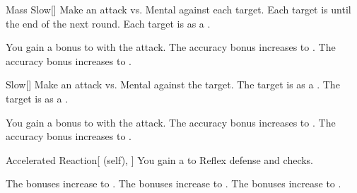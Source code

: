 \lowercase{\hypertarget{spell:Mass Slow}{}}\label{spell:Mass Slow}
\begin{freeability}[Rank 1]{\hypertarget{spell:Mass Slow}{Mass Slow}}[]
Make an attack vs. Mental against each target.
\hit Each target is  until the end of the next round.
\crit Each target is  as a .

\rankline
{} You gain a  bonus to  with the attack.
 The accuracy bonus increases to .
 The accuracy bonus increases to .

\end{freeability}
\vspace{0.25em}



\lowercase{\hypertarget{spell:Slow}{}}\label{spell:Slow}
\begin{freeability}[Rank 1]{\hypertarget{spell:Slow}{Slow}}[]
Make an attack vs. Mental against the target.
\hit The target is  as a .
\crit The target is  as a .

\rankline
{} You gain a  bonus to  with the attack.
 The accuracy bonus increases to .
 The accuracy bonus increases to .

\end{freeability}
\vspace{0.25em}



\lowercase{\hypertarget{spell:Accelerated Reaction}{}}\label{spell:Accelerated Reaction}
\begin{attuneability}[Rank 2]{\hypertarget{spell:Accelerated Reaction}{Accelerated Reaction}}[ (self), ]
You gain a   to Reflex defense and  checks.

\rankline
{} The bonuses increase to .
 The bonuses increase to .
 The bonuses increase to .

\end{attuneability}
\vspace{0.25em}




